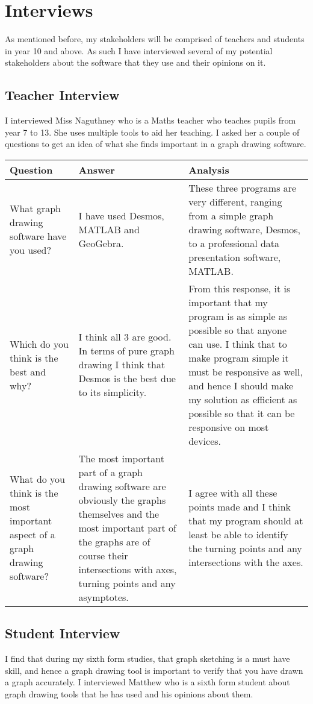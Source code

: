 \documentclass[../../../main.tex]{subfiles}
\begin{document}
\chapter{Interviews}
As mentioned before, my stakeholders will be comprised of teachers and students in year 10 and above. As such I have interviewed several of my potential stakeholders about the software that they use and their opinions on it. 
\section{Teacher Interview}
I interviewed Miss Naguthney who is a Maths teacher who teaches pupils from year 7 to 13. She uses multiple tools to aid her teaching. I asked her a couple of questions to get an idea of what she finds important in a graph drawing software.

\begin{table}[H]
\begin{tabularx}{\textwidth}{@{} Y Y Y @{}}
\toprule
Question & Answer & Analysis \\
\midrule
What graph drawing software have you used? & I have used Desmos, MATLAB and GeoGebra. & These three programs are very different, ranging from a simple graph drawing software, Desmos, to a professional data presentation software, MATLAB.
 \\ \addlinespace \midrule
Which do you think is the best and why? & I think all 3 are good. In terms of pure graph drawing I think
that Desmos is the best due to its simplicity. & From this response, it is important that my program is as simple as possible so that anyone can use. I think that to make program simple it must be responsive as well, and hence I should make my solution as efficient as possible so that it can be responsive on most devices. \\ \addlinespace \midrule
What do you think is the most important
aspect of a graph drawing software? & The most important part of a graph drawing software are obviously the graphs themselves and the most important part of the graphs are of course their intersections with axes, turning points and any asymptotes. & I agree with all these points made and I think that my program should at least be able to identify the turning points and any intersections with the axes.\\
\bottomrule
\end{tabularx}
\end{table}


\newpage
\section{Student Interview}
I find that during my sixth form studies, that graph sketching is a must have skill, and hence a graph drawing tool is important to verify that you have drawn a graph accurately. I interviewed Matthew who is a sixth form student about graph drawing tools that he has used and his opinions about them.
\end{document}
